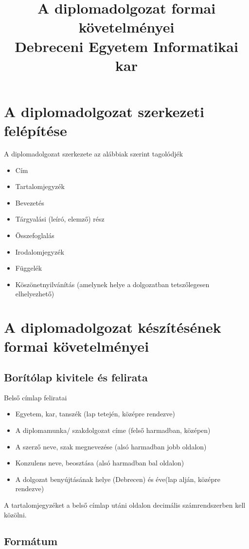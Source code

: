 \documentclass[magyar,12pt,oneside]{article}
\title{A diplomadolgozat formai követelményei \\ Debreceni Egyetem Informatikai kar}
\author{}
\date{}
\begin{document}
\maketitle
\section[Szerkezeti felépítés]{A diplomadolgozat szerkezeti felépítése}

A diplomadolgozat szerkezete az alábbiak szerint tagolódjék
\begin{itemize}
\item Cím
\item Tartalomjegyzék
\item Bevezetés
\item Tárgyalási (leíró, elemző) rész
\item Összefoglalás
\item Irodalomjegyzék
\item Függelék
\item Köszönetnyilvánítás (amelynek helye a dolgozatban tetszőlegesen elhelyezhető)
\end{itemize}


\section[Formai követelmények]{A diplomadolgozat készítésének formai követelményei}

\subsection[Borítólap]{Borítólap kivitele és felirata}

Belső címlap feliratai
\begin{itemize}
\item Egyetem, kar, tanszék (lap tetején, középre rendezve)
\item A diplomamunka/ szakdolgozat címe (felső harmadban, középen)
\item A szerző neve, szak megnevezése (alsó harmadban jobb oldalon)
\item Konzulens neve, beosztása (alsó harmadban bal oldalon)
\item A dolgozat benyújtásának helye (Debrecen) és éve(lap alján, középre rendezve)
\end{itemize}
A tartalomjegyzéket a belső címlap utáni oldalon decimális számrendszerben kell közölni.

\subsection[Formátum]{Formátum}
\end{document}
